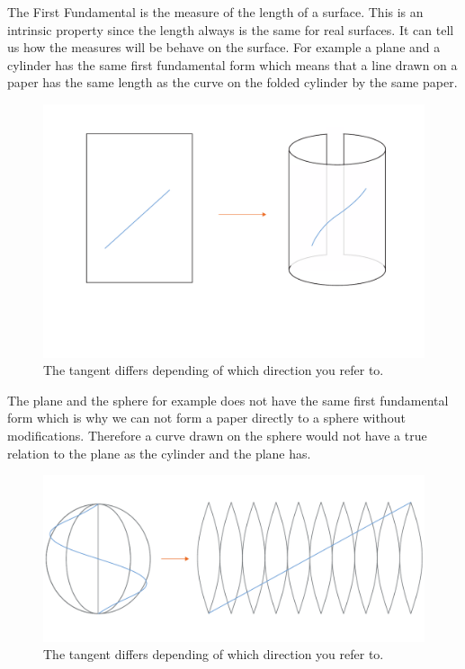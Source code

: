 The First Fundamental is the measure of the length of a surface. This is an intrinsic property since the length always is the same for real surfaces. It can tell us how the measures will be behave on the surface. For example a plane and a cylinder has the same first fundamental form which means that  a line drawn on a paper has the same length as the curve on the folded cylinder by the same paper.

\begin{figure}[H]
\centering
\includegraphics[width=0.9\linewidth ]{figure/Theory/FirstFundamental.pdf}
\caption{The tangent differs depending of which direction you refer to. }
\end{figure}

The plane and the sphere for example does not have the same first fundamental form which is why we can not form a paper directly to a sphere without modifications. Therefore a curve drawn on the sphere would not have a true relation to the plane as the cylinder and the plane has.

\begin{figure}[H]
\centering
\includegraphics[width=0.9\linewidth ]{figure/Theory/unrollSurfMod.pdf}
\caption{The tangent differs depending of which direction you refer to. }
\end{figure}


